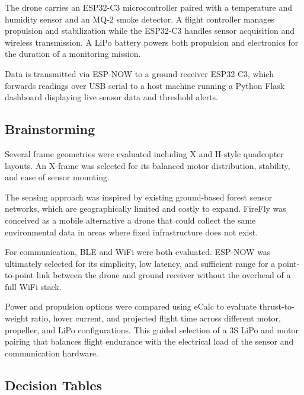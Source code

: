 \documentclass[journal, onecolumn]{IEEEtran}
\begin{document}
\vspace{0.5em}

The drone carries an ESP32-C3 microcontroller paired with a 
temperature and humidity sensor and an MQ-2 smoke detector. A flight 
controller manages propulsion and stabilization while the ESP32-C3 handles 
sensor acquisition and wireless transmission. A LiPo battery powers both 
propulsion and electronics for the duration of a monitoring mission.

\vspace{0.5em}

Data is transmitted via ESP-NOW to a ground receiver ESP32-C3, which 
forwards readings over USB serial to a host machine running a Python Flask 
dashboard displaying live sensor data and threshold alerts.

\subsection{Brainstorming}
Several frame geometries were evaluated including X and H-style quadcopter 
layouts. An X-frame was selected for its balanced motor distribution, 
stability, and ease of sensor mounting.

\vspace{0.5em}

The sensing approach was inspired by existing ground-based forest sensor 
networks, which are geographically limited and costly to expand. FireFly was 
conceived as a mobile alternative a drone that could collect the same 
environmental data in areas where fixed infrastructure does not exist.

\vspace{0.5em}

For communication, BLE and WiFi were both evaluated. ESP-NOW was ultimately 
selected for its simplicity, low latency, and sufficient range for a 
point-to-point link between the drone and ground receiver without the 
overhead of a full WiFi stack.

\vspace{0.5em}

Power and propulsion options were compared using eCalc to evaluate 
thrust-to-weight ratio, hover current, and projected flight time across 
different motor, propeller, and LiPo configurations. This guided selection 
of a 3S LiPo and motor pairing that balances flight endurance with the 
electrical load of the sensor and communication hardware.

\subsection{Decision Tables}
\end{document}
